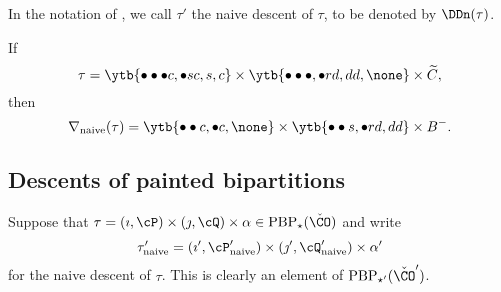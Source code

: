 \documentclass[ssunip]{subfiles}
\begin{document}
\begin{defn}
 In the notation of , we call $\tau'$ the naive descent of $\tau$, to be denoted by $\DDn(\tau)$.  
\end{defn} 

  

  
 \begin{Example} If
    \[
     \tau = \ytb{\bullet\bullet\bullet {c},\bullet {s} {c},{s},{c}}
    \times \ytb{\bullet\bullet\bullet ,\bullet {r} {d},{d}{d}, \none}
    \times \widetilde C, \]
   then 
   \[
    \nabla_{\mathrm{naive}}(\tau) =\ytb{\bullet\bullet{c} ,\bullet{c},\none }
    \times  \ytb{\bullet\bullet {s} ,\bullet {r} {d},{d}{d}}\times B^-.
    \]
    
\end{Example}
 
  \subsection{Descents of painted bipartitions}\label{sec:desc}
 

Suppose that 
$
\tau=(\imath,\cP)\times(\jmath,\cQ)\times \alpha \in  \mathrm{PBP}_\star(\check \CO)
$
and write 
\[
  \tau'_{\mathrm{naive}}=(\imath', \cP'_{\mathrm{naive}})\times (\jmath', \cQ'_{\mathrm{naive}})\times \alpha'
\]
for the naive descent of $\tau$. This is clearly an element of $  \mathrm{PBP}_{\star'}(\check \CO')$. 
\end{document}
